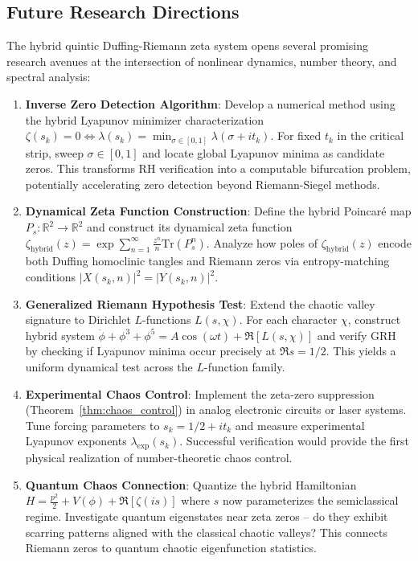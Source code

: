 \documentclass{ws-ijbc}
\begin{document}
\subsection{Future Research Directions}

The hybrid quintic Duffing-Riemann zeta system opens several promising research avenues at the intersection of nonlinear dynamics, number theory, and spectral analysis:

\begin{enumerate}
\item \textbf{Inverse Zero Detection Algorithm}: Develop a numerical method using the hybrid Lyapunov minimizer characterization $\zeta(s_k)=0\iff\lambda(s_k)=\min_{\sigma\in[0,1]}\lambda(\sigma+it_k)$. For fixed $t_k$ in the critical strip, sweep $\sigma\in[0,1]$ and locate global Lyapunov minima as candidate zeros. This transforms RH verification into a computable bifurcation problem, potentially accelerating zero detection beyond Riemann-Siegel methods.

\item \textbf{Dynamical Zeta Function Construction}: Define the hybrid Poincaré map $P_s:\mathbb{R}^2\to\mathbb{R}^2$ and construct its dynamical zeta function $\zeta_\text{hybrid}(z)=\exp\sum_{n=1}^\infty\frac{z^n}{n}\text{Tr}(P_s^n)$. Analyze how poles of $\zeta_\text{hybrid}(z)$ encode both Duffing homoclinic tangles and Riemann zeros via entropy-matching conditions $|X(s_k,n)|^2=|Y(s_k,n)|^2$.

\item \textbf{Generalized Riemann Hypothesis Test}: Extend the chaotic valley signature to Dirichlet $L$-functions $L(s,\chi)$. For each character $\chi$, construct hybrid system $\ddot{\phi}+\phi^3+\phi^5=A\cos(\omega t)+\Re[L(s,\chi)]$ and verify GRH by checking if Lyapunov minima occur precisely at $\Re s=1/2$. This yields a uniform dynamical test across the $L$-function family.

\item \textbf{Experimental Chaos Control}: Implement the zeta-zero suppression (Theorem~\ref{thm:chaos_control}) in analog electronic circuits or laser systems. Tune forcing parameters to $s_k=1/2+it_k$ and measure experimental Lyapunov exponents $\lambda_\text{exp}(s_k)$. Successful verification would provide the first physical realization of number-theoretic chaos control.

\item \textbf{Quantum Chaos Connection}: Quantize the hybrid Hamiltonian $H=\frac{p^2}{2}+V(\phi)+\Re[\zeta(is)]$ where $s$ now parameterizes the semiclassical regime. Investigate quantum eigenstates near zeta zeros -- do they exhibit scarring patterns aligned with the classical chaotic valleys? This connects Riemann zeros to quantum chaotic eigenfunction statistics.


\end{enumerate}
\end{document}
